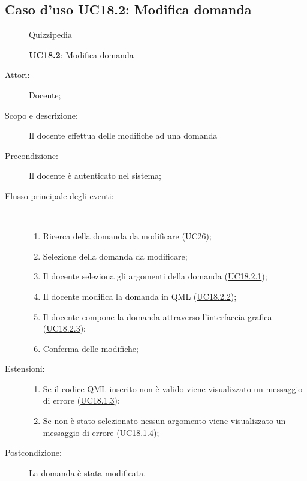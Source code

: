 \subsection{Caso d'uso UC18.2: Modifica domanda}
	\begin{figure}[H]
		\centering
		\begin{resizedtikzpicture}{\textwidth}
		\begin{umlsystem}[x=0, fill=lightgray!20]{Quizzipedia}
		\end{umlsystem}
		\end{resizedtikzpicture}
		\caption{\textbf{UC18.2}: Modifica domanda}
		\label{UC18.2}
	\end{figure}
\begin{description}
\item[Attori:] Docente;
\item[Scopo e descrizione:] Il docente effettua delle modifiche ad una domanda 
      \item[Precondizione:] Il docente è autenticato nel sistema;

        \item[Flusso principale degli eventi:] \ 
 \begin{enumerate}
          \item Ricerca della domanda da modificare (\hyperlink{UC26}{UC26});
          \item Selezione della domanda da modificare;
          \item Il docente seleziona gli argomenti della domanda	 (\hyperlink{UC18.2.1}{UC18.2.1});
          \item Il docente modifica la domanda in QML	 (\hyperlink{UC18.2.2}{UC18.2.2});
          \item Il docente compone la domanda attraverso l'interfaccia grafica (\hyperlink{UC18.2.3}{UC18.2.3});
          \item Conferma delle modifiche;

      \end{enumerate}
    \item[Estensioni:]
      \begin{enumerate}
          \item Se il codice QML inserito non è valido viene visualizzato un messaggio di errore (\hyperlink{UC18.1.3}{UC18.1.3});
          \item Se non è stato selezionato nessun argomento viene visualizzato un messaggio di errore (\hyperlink{UC18.1.4}{UC18.1.4});

      \end{enumerate}
    \item[Postcondizione:] La domanda è stata modificata.
  \end{description}
\hypertarget{UC18.2.1}{}
